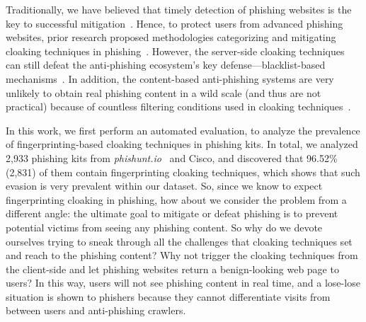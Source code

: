 Traditionally, we have believed that timely detection of phishing websites is the key to successful mitigation~\cite{oest2020sunrise, zhang2021crawlphish}.
Hence, to protect users from advanced phishing websites, prior research proposed methodologies categorizing and mitigating cloaking techniques in phishing~\cite{oest2018inside, oest2019phishfarm, zhang2021crawlphish}.
However, the server-side cloaking techniques can still defeat the anti-phishing ecosystem's key defense---blacklist-based mechanisms~\cite{oest2019phishfarm}.
In addition, the content-based anti-phishing systems are very unlikely to obtain real phishing content in a wild scale (and thus are not practical) because of countless filtering conditions used in cloaking techniques~\cite{oest2018inside, oest2020phishtime}.


In this work, we first perform an automated evaluation, to analyze the prevalence of fingerprinting-based cloaking techniques in phishing kits.
In total, we analyzed 2,933 phishing kits from \emph{phishunt.io}~\cite{phishunt} and Cisco, and discovered that 96.52\% (2,831) of them contain fingerprinting cloaking techniques, which shows that such evasion is very prevalent within our dataset.
So, since we know to expect fingerprinting cloaking in phishing, how about we consider the problem from a different angle:
the ultimate goal to mitigate or defeat phishing is to prevent potential victims from seeing any phishing content.
So why do we devote ourselves trying to sneak through all the challenges that cloaking techniques set and reach to the phishing content?
Why not trigger the cloaking techniques from the client-side and let phishing websites return a benign-looking web page to users?
In this way, users will not see phishing content in real time, and a lose-lose situation is shown to phishers because they cannot differentiate visits from between users and anti-phishing crawlers.

